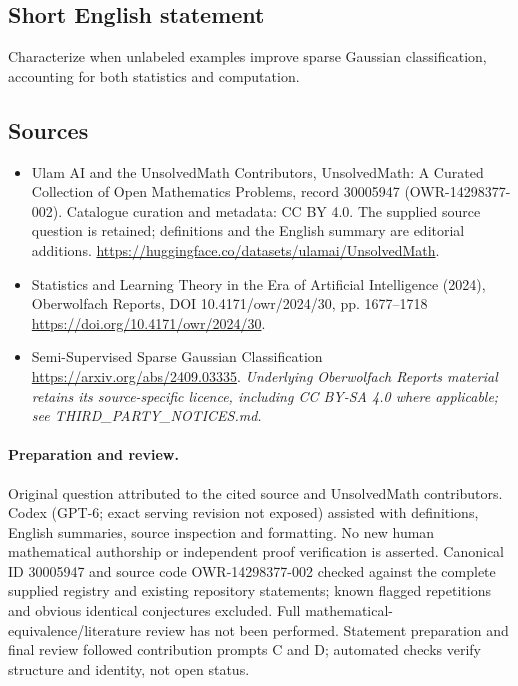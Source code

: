\documentclass[11pt]{article}
\begin{document}
\subsection{Short English statement}
Characterize when unlabeled examples improve sparse Gaussian classification, accounting for both statistics and computation.
\subsection{Sources}
\begin{itemize}
\item[\hypertarget{source:30005947:1}{S1}] Ulam AI and the UnsolvedMath Contributors, UnsolvedMath: A Curated Collection of Open Mathematics Problems, record 30005947 (OWR-14298377-002). Catalogue curation and metadata: CC BY 4.0. The supplied source question is retained; definitions and the English summary are editorial additions.
\url{https://huggingface.co/datasets/ulamai/UnsolvedMath}.
\item[\hypertarget{source:30005947:2}{S2}] Statistics and Learning Theory in the Era of Artificial Intelligence (2024), Oberwolfach Reports, DOI 10.4171/owr/2024/30, pp. 1677--1718
\url{https://doi.org/10.4171/owr/2024/30}.
\item[\hypertarget{source:30005947:3}{S3}] Semi-Supervised Sparse Gaussian Classification
\url{https://arxiv.org/abs/2409.03335}.
\textit{Underlying Oberwolfach Reports material retains its source-specific licence, including CC BY-SA 4.0 where applicable; see THIRD\_PARTY\_NOTICES.md.}
\end{itemize}
\paragraph{Preparation and review.}
Original question attributed to the cited source and UnsolvedMath contributors. Codex (GPT-6; exact serving revision not exposed) assisted with definitions, English summaries, source inspection and formatting. No new human mathematical authorship or independent proof verification is asserted. Canonical ID 30005947 and source code OWR-14298377-002 checked against the complete supplied registry and existing repository statements; known flagged repetitions and obvious identical conjectures excluded. Full mathematical-equivalence/literature review has not been performed. Statement preparation and final review followed contribution prompts C and D; automated checks verify structure and identity, not open status.
\label{end:30005947}
\end{document}
